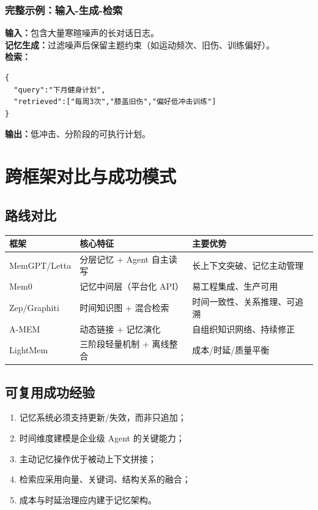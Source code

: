 \documentclass[12pt,a4paper]{article}
\begin{document}
\subsubsection{完整示例：输入-生成-检索}
\textbf{输入：}包含大量寒暄噪声的长对话日志。\\
\textbf{记忆生成：}过滤噪声后保留主题约束（如运动频次、旧伤、训练偏好）。\\
\textbf{检索：}
\begin{verbatim}
{
  "query":"下月健身计划",
  "retrieved":["每周3次","膝盖旧伤","偏好低冲击训练"]
}
\end{verbatim}
\textbf{输出：}低冲击、分阶段的可执行计划。

\section{跨框架对比与成功模式}
\subsection{路线对比}
\begin{longtable}{p{2.6cm}p{4.8cm}p{6.2cm}}
\toprule
框架 & 核心特征 & 主要优势 \\
\midrule
MemGPT/Letta & 分层记忆 + Agent 自主读写 & 长上下文突破、记忆主动管理 \\
Mem0 & 记忆中间层（平台化 API） & 易工程集成、生产可用 \\
Zep/Graphiti & 时间知识图 + 混合检索 & 时间一致性、关系推理、可追溯 \\
A-MEM & 动态链接 + 记忆演化 & 自组织知识网络、持续修正 \\
LightMem & 三阶段轻量机制 + 离线整合 & 成本/时延/质量平衡 \\
\bottomrule
\end{longtable}

\subsection{可复用成功经验}
\begin{enumerate}[leftmargin=2em]
  \item 记忆系统必须支持更新/失效，而非只追加；
  \item 时间维度建模是企业级 Agent 的关键能力；
  \item 主动记忆操作优于被动上下文拼接；
  \item 检索应采用向量、关键词、结构关系的融合；
  \item 成本与时延治理应内建于记忆架构。
\end{enumerate}
\end{document}
